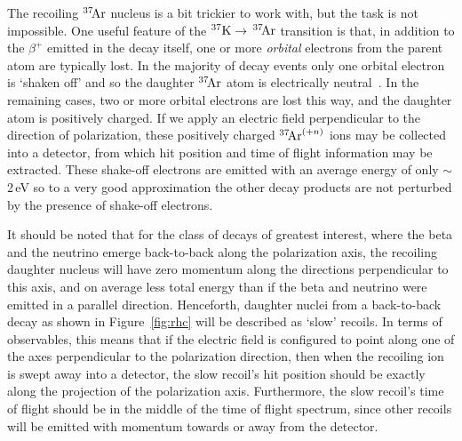 The recoiling $^{37}\textrm{\!Ar}$ nucleus is a bit trickier to work with, but the task is not impossible.  One useful feature of the $^{37}\textrm{K} \rightarrow \,^{37}\textrm{\!Ar}$ transition is that, in addition to the $\beta^+$ emitted in the decay itself, one or more \emph{orbital} electrons from the parent atom are typically lost.  In the majority of decay events
only one orbital electron is `shaken off' and so the daughter $^{37}\textrm{\!Ar}$ atom is electrically neutral~\cite{gorelov2000}\cite{dan_thesis}.  In the remaining cases, two or more orbital electrons are lost this way, and the daughter atom is positively charged.  If we apply an electric field perpendicular to the direction of polarization, these positively charged $^{37}\textrm{\!Ar}^{(+n)}$ ions may be collected into a detector, from which hit position and time of flight information may be extracted.  These shake-off electrons are emitted with an average energy of only $\sim$ 2\,eV
so to a very good approximation the other decay products are not perturbed by the presence of shake-off electrons.  

It should be noted that for the class of decays of greatest interest, where the beta and the neutrino emerge back-to-back along the polarization axis, the recoiling daughter nucleus will have zero momentum along the directions perpendicular to this axis, and on average less total energy than if the beta and neutrino were emitted in a parallel direction.  Henceforth, daughter nuclei from a back-to-back decay as shown in Figure~\ref{fig:rhc} will be described as `slow' recoils.  In terms of observables, this means that if the electric field is configured to point along one of the axes perpendicular to the polarization direction, then when the recoiling ion is swept away into a detector, the slow recoil's hit position should be exactly along the projection of the polarization axis.  Furthermore, the slow recoil's time of flight should be in the middle of the time of flight spectrum, since other recoils will be emitted with momentum towards or away from the detector.  


